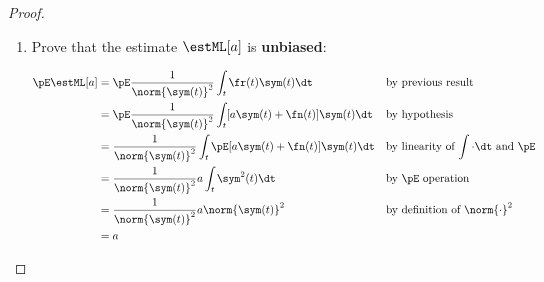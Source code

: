 \begin{proof}
\begin{enumerate}
\item Prove that the estimate $\estML[a]$ is {\bf unbiased}:

\begin{align*}
   \pE\estML[a]
     &= \pE\frac{1}{\norm{\sym(t)}^2} \int_t \fr(t)\sym(t) \dt
     && \text{by previous result}
   \\&= \pE\frac{1}{\norm{\sym(t)}^2} \int_t [ a \sym(t)+\fn(t)]\sym(t) \dt
     && \text{by hypothesis}
   \\&= \frac{1}{\norm{\sym(t)}^2} \int_t \pE[ a \sym(t)+\fn(t)]\sym(t) \dt
     && \text{by linearity of $\int\cdot\dt$ and $\pE$}
   \\&= \frac{1}{\norm{\sym(t)}^2}  a  \int_t \sym^2(t) \dt
     && \text{by $\pE$ operation}
   \\&= \frac{1}{\norm{\sym(t)}^2}  a  \norm{\sym(t)}^2
     && \text{by definition of $\norm{\cdot}^2$}
   \\&=   a
\end{align*}


\end{enumerate}
\end{proof}
